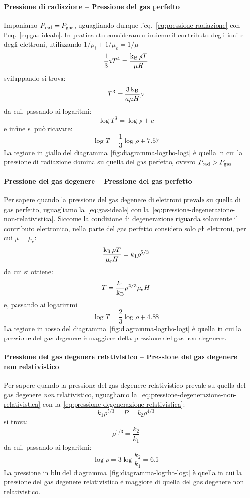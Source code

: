 \paragraph{Pressione di radiazione -- Pressione del gas perfetto}
Imponiamo $P_\textup{rad} = P_\textup{gas}$, uguagliando dunque l'eq.~\eqref{eq:pressione-radiazione} con l'eq.~\eqref{eq:gas-ideale}. In pratica sto considerando insieme il contributo degli ioni e degli elettroni, utilizzando $1/ \mu_i + 1 / \mu_e = 1 / \mu$
\[
\frac{1}{3} a T^4 = \frac{\operatorname{k_B} \rho T}{\mu H}
\]
sviluppando si trova:
\[
T^3 = \dfrac{3\operatorname{k_B}}{a\mu H} \rho
\]
da cui, passando ai logaritmi:
\[
\log T^3 = \log \rho + c
\]
e infine si può ricavare:
\begin{equation}\label{prad-pgas}
    \log T = \frac{1}{3} \log \rho + 7.57
\end{equation}
La regione in giallo del diagramma~\ref{fig:diagramma-logrho-logt} è quella in cui la pressione di radiazione domina su quella del gas perfetto, ovvero $P_\textup{rad} > P_\textup{gas}$

\paragraph{Pressione del gas degenere -- Pressione del gas perfetto}
Per sapere quando la pressione del gas degenere di elettroni prevale su quella di gas perfetto, uguagliamo la~\eqref{eq:gas-ideale} con la~\eqref{eq:pressione-degenerazione-non-relativistica}. Siccome la condizione di degenerazione riguarda solamente il contributo elettronico, nella parte del gas perfetto considero solo gli elettroni, per cui $\mu = \mu_e$:
\[
\frac{\operatorname{k_B} \rho T}{\mu_e H} = k_1 \rho^{5/3}
\]
da cui si ottiene:
\[
T = \frac{k_1}{\operatorname{k_B}} \rho^{2/3} \mu_e H
\]
e, passando ai logarirtmi:
\begin{equation}\label{eq:pgas-pdeg}
    \log T = \frac{2}{3} \log \rho + 4.88
\end{equation}
La regione in rosso del diagramma~\ref{fig:diagramma-logrho-logt} è quella in cui la pressione del gas degenere è maggiore della pressione del gas non degenere.

\paragraph{Pressione del gas degenere relativistico -- Pressione del gas degenere non relativistico}
Per sapere quando la pressione del gas degenere relativistico prevale su quella del gas degenere \emph{non} relativistico, uguagliamo la~\eqref{eq:pressione-degenerazione-non-relativistica} con la~\eqref{eq:pressione-degenerazione-relativistica}:
\[
k_1 \rho^{5/3} = P = k_2 \rho^{4/3}
\]
si trova:
\[
\rho^{1/3} = \frac{k_2}{k_1}
\]
da cui, passando ai logaritmi:
\begin{equation}\label{eq:pdegrel-pdegnonrel}
    \log \rho = 3 \log \frac{k_2}{k_1} = 6.6
\end{equation}
La pressione in blu del diagramma~\ref{fig:diagramma-logrho-logt} è quella in cui la pressione del gas degenere relativistico è maggiore di quella del gas degenere non relativistico.


